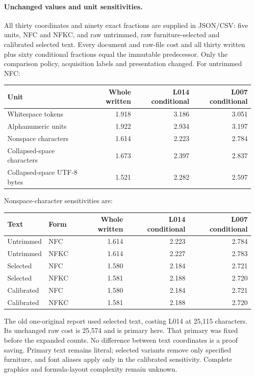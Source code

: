 \documentclass[11pt,a4paper]{article}
\begin{document}
\paragraph{Unchanged values and unit sensitivities.}
All thirty coordinates and ninety exact fractions are supplied in JSON/CSV:
five units, NFC and NFKC, and raw untrimmed, raw furniture-selected and
calibrated selected text. Every document and raw-file cost and all thirty
written plus sixty conditional fractions equal the immutable predecessor.
Only the comparison policy, acquisition labels and presentation changed.
For untrimmed NFC:
\begin{center}\small\begin{tabular}{lrrr}\toprule
Unit&Whole written&L014 conditional&L007 conditional\\\midrule
Whitespace tokens & 1.918 & 3.186 & 3.051 \\
Alphanumeric units & 1.922 & 2.934 & 3.197 \\
Nonspace characters & 1.614 & 2.223 & 2.784 \\
Collapsed-space characters & 1.673 & 2.397 & 2.837 \\
Collapsed-space UTF-8 bytes & 1.521 & 2.282 & 2.597 \\
\bottomrule\end{tabular}\end{center}
Nonspace-character sensitivities are:
\begin{center}\small\begin{tabular}{llrrr}\toprule
Text&Form&Whole written&L014 conditional&L007 conditional\\\midrule
Untrimmed & NFC & 1.614 & 2.223 & 2.784 \\
Untrimmed & NFKC & 1.614 & 2.227 & 2.783 \\
Selected & NFC & 1.580 & 2.184 & 2.721 \\
Selected & NFKC & 1.581 & 2.188 & 2.720 \\
Calibrated & NFC & 1.580 & 2.184 & 2.721 \\
Calibrated & NFKC & 1.581 & 2.188 & 2.720 \\
\bottomrule\end{tabular}\end{center}
The old one-original report used selected text, costing L014 at 25,115
characters. Its unchanged raw cost is 25,574 and is primary here. That
primary was fixed before the expanded counts. No difference between text
coordinates is a proof saving. Primary text remains literal; selected variants
remove only specified furniture, and font aliases apply only in the calibrated
sensitivity. Complete graphics and formula-layout complexity remain unknown.
\end{document}
